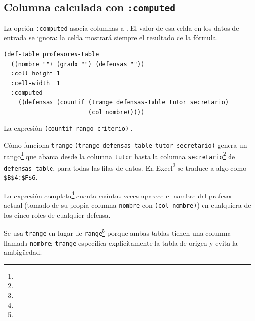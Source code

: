 \documentclass[12pt,a4paper]{report}
\begin{document}

\subsection{Columna calculada con \texttt{:computed}}

La opción \texttt{:computed} asocia columnas a  .  El valor de esa celda en los datos de
entrada se ignora: la celda mostrará siempre el resultado de la
fórmula.



\begin{lstlisting}[caption={Columna defensas calculada con COUNTIF.}]
(def-table profesores-table
  ((nombre "") (grado "") (defensas ""))
  :cell-height 1
  :cell-width  1
  :computed
    ((defensas (countif (trange defensas-table tutor secretario)
                        (col nombre)))))
\end{lstlisting}

La expresión \texttt{(countif rango criterio)} .


\begin{infobox}{Cómo funciona \texttt{trange}}
  \texttt{(trange defensas-table tutor secretario)} genera un
  rango\footnote{} que abarca desde la columna
  \texttt{tutor} hasta la columna \texttt{secretario}\footnote{} de
  \texttt{defensas-table}, para todas las filas de datos.  En Excel\footnote{} se
  traduce a algo como \texttt{\$B\$4:\$F\$6}.

La expresión completa\footnote{} cuenta cuántas veces aparece el nombre del profesor
actual (tomado de su propia columna \texttt{nombre} con \texttt{(col nombre)})
en cualquiera de los cinco roles de cualquier defensa.

Se usa \texttt{trange} en lugar de \texttt{range}\footnote{} porque ambas tablas
tienen una columna llamada \texttt{nombre}: \texttt{trange} especifica
explícitamente la tabla de origen y evita la ambigüedad. 
\end{infobox}
\end{document}
